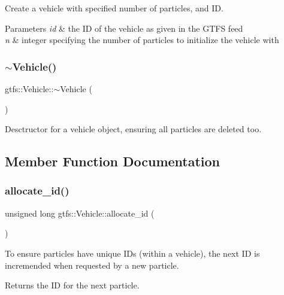 Create a vehicle with specified number of particles, and ID.


\begin{DoxyParams}{Parameters}
{\em id} & the ID of the vehicle as given in the G\+T\+FS feed \\
\hline
{\em n} & integer specifying the number of particles to initialize the vehicle with \\
\hline
\end{DoxyParams}
\mbox{\label{classgtfs_1_1Vehicle_a08c7450dd0df9406f78b30be044d27d8}} 
\subsubsection{\texorpdfstring{$\sim$\+Vehicle()}{~Vehicle()}}
{\footnotesize\ttfamily gtfs\+::\+Vehicle\+::$\sim$\+Vehicle (\begin{DoxyParamCaption}{ }\end{DoxyParamCaption})}

Desctructor for a vehicle object, ensuring all particles are deleted too. 

\subsection{Member Function Documentation}
\mbox{\label{classgtfs_1_1Vehicle_aa9087e973a9821f384ec47f51bdcedc7}} 
\subsubsection{\texorpdfstring{allocate\+\_\+id()}{allocate\_id()}}
{\footnotesize\ttfamily unsigned long gtfs\+::\+Vehicle\+::allocate\+\_\+id (\begin{DoxyParamCaption}{ }\end{DoxyParamCaption})}

To ensure particles have unique ID\textquotesingle{}s (within a vehicle), the next ID is incremended when requested by a new particle.

\begin{DoxyReturn}{Returns}
the ID for the next particle. 
\end{DoxyReturn}
\mbox{\label{classgtfs_1_1Vehicle_a6b388986c9ed4af1eb86f13a3d2de8e0}} 
